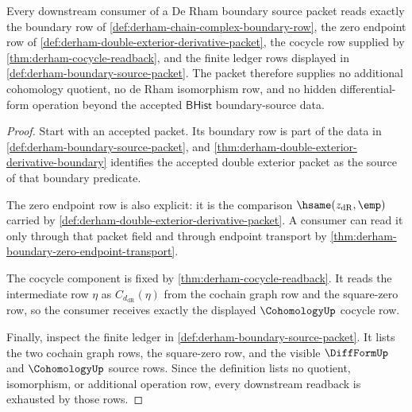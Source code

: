 \begin{theorem}
\label{thm:derham-boundary-consumer-exactness}
Every downstream consumer of a De Rham boundary source packet reads exactly the
boundary row of \autoref{def:derham-chain-complex-boundary-row}, the zero
endpoint row of \autoref{def:derham-double-exterior-derivative-packet}, the
cocycle row supplied by \autoref{thm:derham-cocycle-readback}, and the finite
ledger rows displayed in \autoref{def:derham-boundary-source-packet}. The packet
therefore supplies no additional cohomology quotient, no de Rham isomorphism
row, and no hidden differential-form operation beyond the accepted
$\mathsf{BHist}$ boundary-source data.
\end{theorem}
\begin{proof}
Start with an accepted packet. Its boundary row is part of the data in
\autoref{def:derham-boundary-source-packet}, and
\autoref{thm:derham-double-exterior-derivative-boundary} identifies the
accepted double exterior packet as the source of that boundary predicate.

The zero endpoint row is also explicit: it is the comparison
$\hsame(z_{\mathrm{dR}},\emp)$ carried by
\autoref{def:derham-double-exterior-derivative-packet}. A consumer can read it
only through that packet field and through endpoint transport by
\autoref{thm:derham-boundary-zero-endpoint-transport}.

The cocycle component is fixed by \autoref{thm:derham-cocycle-readback}. It
reads the intermediate row $\eta$ as $C_{d_{\mathrm{dR}}}(\eta)$ from the
cochain graph row and the square-zero row, so the consumer receives exactly the
displayed $\CohomologyUp$ cocycle row.

Finally, inspect the finite ledger in
\autoref{def:derham-boundary-source-packet}. It lists the two cochain graph
rows, the square-zero row, and the visible $\DiffFormUp$ and $\CohomologyUp$
source rows. Since the definition lists no quotient, isomorphism, or additional
operation row, every downstream readback is exhausted by those rows.
\end{proof}

